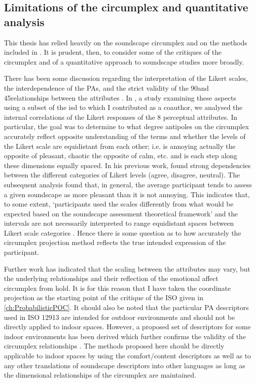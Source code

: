 \subsection{Limitations of the circumplex and quantitative analysis}

This thesis has relied heavily on the soundscape circumplex and on the methods included in \cite{ISO12913Part2}. It is prudent, then, to consider some of the critiques of the circumplex and of a quantitative approach to soundscape studies more broadly.

There has been some discussion regarding the interpretation of the Likert scales, the interdependence of the PAs, and the strict validity of the 90\textdegree and 45\textdegree relationships between the attributes \citep{Lionello2021Thesis}. In \citet{Lionello2021Introducing}, a study examining these aspects using a subset of the \gls{isd} to which I contributed as a coauthor, we analysed the internal correlations of the Likert responses of the 8 perceptual attributes. In particular, the goal was to determine to what degree antipoles on the circumplex accurately reflect opposite understanding of the terms and whether the levels of the Likert scale are equidistant from each other; i.e. is annoying actually the opposite of pleasant, chaotic the opposite of calm, etc. and is each step along these dimensions equally spaced. In his previous work, \citet{Lionello2019dimension} found strong dependencies between the different categories of Likert levels (agree, disagree, neutral). The subsequent analysis found that, in general, the average participant tends to assess a given soundscape as more pleasant than it is not annoying. This indicates that, to some extent, `participants used the scales differently from what would be expected based on the soundscape assessment theoretical framework' and the intervals are not necessarily interpreted to range equidistant spaces between Likert scale categories \citep{Lionello2021Introducing}. Hence there is some question as to how accurately the circumplex projection method reflects the true intended expression of the participant.

Further work has indicated that the scaling between the attributes may vary, but the underlying relationships and their reflection of the emotional affect circumplex from \citet{Russell1980circumplex} hold. It is for this reason that I have taken the coordinate projection as the starting point of the critique of the ISO given in \cref{ch:ProbabilisticPOC}. It should also be noted that the particular PA descriptors used in ISO 12913 are intended for outdoor environments and should not be directly applied to indoor spaces. However, a proposed set of descriptors for some indoor environments has been derived which further confirms the validity of the circumplex relationships \citep{Torresin2020Indoor}. The methods proposed here should be directly applicable to indoor spaces by using the comfort/content descriptors as well as to any other translations of soundscape descriptors into other languages \citep{Aletta2020Soundscape} as long as the dimensional relationships of the circumplex are maintained.

